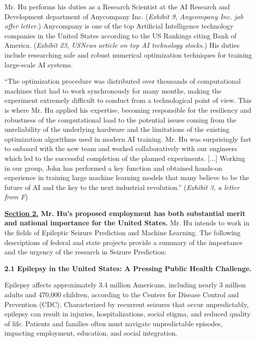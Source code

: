 \documentclass{article}
\begin{document}
Mr. Hu performs his duties as a Research Scientist at the AI Research and Development department of Anycompany Inc. ({\it Exhibit 9, Anycompany Inc. job offer letter.}) Anycompany is one of the top Artificial Intelligence technology companies in the United States according to the US Rankings citing Bank of America. ({\it Exhibit 23, USNews article on top AI technology stocks.}) His duties include researching safe and robust numerical optimization techniques for training large-scale AI systems.

“The optimization procedure was distributed over thousands of computational machines that had to work synchronously for many months, making the experiment extremely difficult to conduct from a technological point of view. This is where Mr. Hu applied his expertise, becoming responsible for the resiliency and robustness of the computational load to the potential issues coming from the unreliability of the underlying hardware and the limitations of the existing optimization algorithms used in modern AI training. Mr. Hu was surprisingly fast to onboard with the new team and worked collaboratively with our engineers which led to the successful completion of the planned experiments. [...] Working in our group, John has performed a key function and obtained hands-on experience in training large machine learning models that many believe to be the future of AI and the key to the next industrial revolution.” ({\it Exhibit 3, a letter from F}) 


\clearpage


{\bf \underline{Section 2.} Mr. Hu’s proposed employment has both substantial merit and national importance for the United States.}
Mr. Hu intends to work in the fields of Epileptic Seizure Prediction and Machine Learning. The following descriptions of federal and state projects provide a summary of the importance and the urgency of the research in  Seizure Prediction:

{\bf 2.1 Epilepsy in the United States: A Pressing Public Health Challenge. }

Epilepsy affects approximately 3.4 million Americans, including nearly 3 million adults and 470,000 children, according to the Centers for Disease Control and Prevention (CDC). Characterized by recurrent seizures that occur unpredictably, epilepsy can result in injuries, hospitalizations, social stigma, and reduced quality of life. Patients and families often must navigate unpredictable episodes, impacting employment, education, and social integration.
\end{document}
